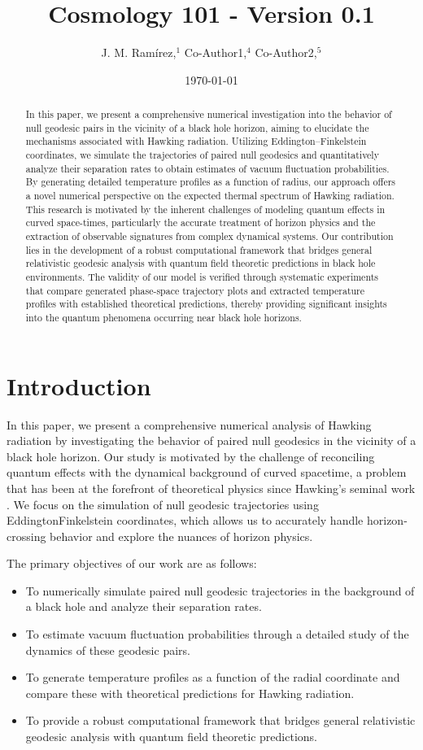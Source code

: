 \documentclass{article}\usepackage{graphicx} \usepackage{amsmath} \usepackage{colortbl}\title{Cosmology 101 - Version 0.1}
\author{J. M. Ram{\'i}rez,$^{1}$ Co-Author1,$^{4}$ Co-Author2,$^{5}$}
\date{\today}
\begin{document}
\maketitle\begin{abstract}
In this paper, we present a comprehensive numerical investigation into the behavior of null geodesic pairs in the vicinity of a black hole horizon, aiming to elucidate the mechanisms associated with Hawking radiation. Utilizing Eddington–Finkelstein coordinates, we simulate the trajectories of paired null geodesics and quantitatively analyze their separation rates to obtain estimates of vacuum fluctuation probabilities. By generating detailed temperature profiles as a function of radius, our approach offers a novel numerical perspective on the expected thermal spectrum of Hawking radiation. This research is motivated by the inherent challenges of modeling quantum effects in curved space-times, particularly the accurate treatment of horizon physics and the extraction of observable signatures from complex dynamical systems. Our contribution lies in the development of a robust computational framework that bridges general relativistic geodesic analysis with quantum field theoretic predictions in black hole environments. The validity of our model is verified through systematic experiments that compare generated phase-space trajectory plots and extracted temperature profiles with established theoretical predictions, thereby providing significant insights into the quantum phenomena occurring near black hole horizons.
\end{abstract}\section{Introduction}
In this paper, we present a comprehensive numerical analysis of Hawking radiation by investigating the behavior of paired null geodesics in the vicinity of a black hole horizon. Our study is motivated by the challenge of reconciling quantum effects with the dynamical background of curved spacetime, a problem that has been at the forefront of theoretical physics since Hawking's seminal work \cite{Hawking1975}. We focus on the simulation of null geodesic trajectories using Eddington\textendash Finkelstein coordinates, which allows us to accurately handle horizon-crossing behavior and explore the nuances of horizon physics.

The primary objectives of our work are as follows:
\begin{itemize}
    \item To numerically simulate paired null geodesic trajectories in the background of a black hole and analyze their separation rates.
    \item To estimate vacuum fluctuation probabilities through a detailed study of the dynamics of these geodesic pairs.
    \item To generate temperature profiles as a function of the radial coordinate and compare these with theoretical predictions for Hawking radiation.
    \item To provide a robust computational framework that bridges general relativistic geodesic analysis with quantum field theoretic predictions.
\end{itemize}
\end{document}
